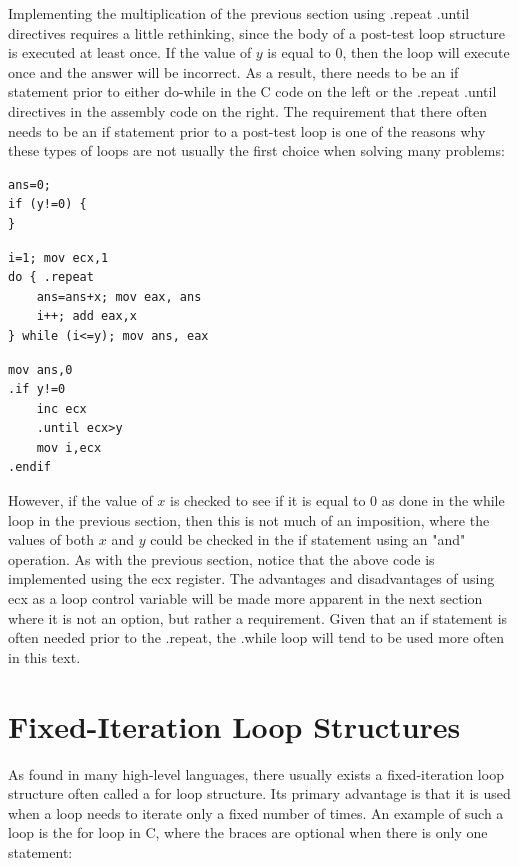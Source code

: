 \documentclass[10pt]{book}
\begin{document}
Implementing the multiplication of the previous section using .repeat .until directives requires a little rethinking, since the body of a post-test loop structure is executed at least once. If the value of $y$ is equal to 0, then the loop will execute once and the answer will be incorrect. As a result, there needs to be an if statement prior to either do-while in the C code on the left or the .repeat .until directives in the assembly code on the right. The requirement that there often needs to be an if statement prior to a post-test loop is one of the reasons why these types of loops are not usually the first choice when solving many problems:

\begin{verbatim}
ans=0;
if (y!=0) {
}
\end{verbatim}

\begin{verbatim}
i=1; mov ecx,1
do { .repeat
    ans=ans+x; mov eax, ans
    i++; add eax,x
} while (i<=y); mov ans, eax
\end{verbatim}

\begin{verbatim}
mov ans,0
.if y!=0
    inc ecx
    .until ecx>y
    mov i,ecx
.endif
\end{verbatim}

However, if the value of $x$ is checked to see if it is equal to 0 as done in the while loop in the previous section, then this is not much of an imposition, where the values of both $x$ and $y$ could be checked in the if statement using an "and" operation. As with the previous section, notice that the above code is implemented using the ecx register. The advantages and disadvantages of using ecx as a loop control variable will be made more apparent in the next section where it is not an option, but rather a requirement. Given that an if statement is often needed prior to the .repeat, the .while loop will tend to be used more often in this text.

\section{Fixed-Iteration Loop Structures}
As found in many high-level languages, there usually exists a fixed-iteration loop structure often called a for loop structure. Its primary advantage is that it is used when a loop needs to iterate only a fixed number of times. An example of such a loop is the for loop in C, where the braces are optional when there is only one statement:
\end{document}
